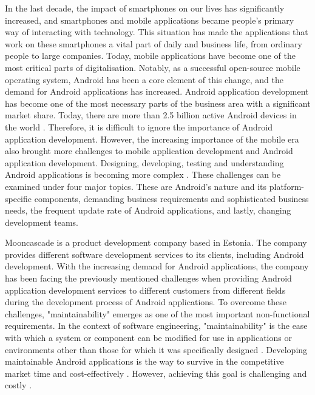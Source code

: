 In the last decade, the impact of smartphones on our lives has significantly increased, and smartphones and mobile applications became people's primary way of interacting with technology. This situation has made the applications that work on these smartphones a vital part of daily and business life, from ordinary people to large companies. Today, mobile applications have become one of the most critical parts of digitalisation. Notably, as a successful open-source mobile operating system, Android has been a core element of this change, and the demand for Android applications has increased. Android application development has become one of the most necessary parts of the business area with a significant market share. Today, there are more than 2.5 billion active Android devices in the world \cite{1}. Therefore, it is difficult to ignore the importance of Android application development.
However, the increasing importance of the mobile era also brought more challenges to mobile application development and Android application development. Designing, developing, testing and understanding Android applications is becoming more complex \cite{34}. These challenges can be examined under four major topics. These are Android’s nature and its platform-specific components, demanding business requirements and sophisticated business needs, the frequent update rate of Android applications, and lastly, changing development teams. 

Mooncascade is a  product development company based in Estonia. The company provides different software development services to its clients, including Android development. With the increasing demand for Android applications, the company has been facing the previously mentioned challenges when providing Android application development services to different customers from different fields during the development process of Android applications. To overcome these challenges, "maintainability" emerges as one of the most important non-functional requirements. In the context of software engineering, "maintainability" is the ease with which a system or component can be modified for use in applications or environments other than those for which it was specifically designed \cite{20}. Developing maintainable Android applications is the way to survive in the competitive market time and cost-effectively \cite{50}. However, achieving this goal is challenging and costly \cite{34}.

